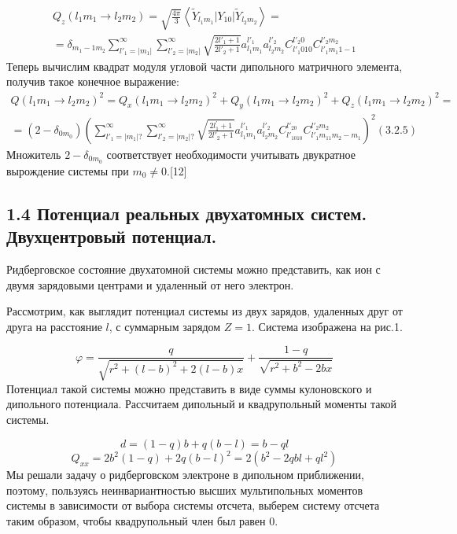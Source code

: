 \documentclass[a4paper]{article}
\begin{document}
\begin{multline*}
Q_z\left(l_1m_1\rightarrow l_2m_2\right)=\sqrt{\frac{4\pi } 3} \left< \widetilde Y_{l_1m_1}|Y_{10}|\widetilde Y_{l_2m_2} \right> =
\\
= \delta_{m_1-1 m_2}\sum_{l'_1=|m_1|}^{\infty} \sum_{l'_2=|m_2|}^{\infty}\sqrt{\frac{2l'_1+1}{2l'_2+1}}a_{l_1 m_1}^{l'_1 } a_{l_2 m_2}^{l'_2} C_{l'_1 010}^{l'_2 0} C_{l'_1 m_1 1-1}^{l'_2 m_2 }
\end{multline*}
Теперь вычислим квадрат модуля угловой части дипольного матричного элемента, получив такое конечное выражение:
\begin{multline*}
	Q\left(l_1m_1\rightarrow l_2m_2\right)^2=
Q_x\left(l_1m_1\rightarrow l_2m_2\right)^2+Q_y\left(l_1m_1\rightarrow l_2m_2\right)^2+Q_z\left(l_1m_1\rightarrow l_2m_2\right)^2 =
\\
= \left(2-\delta _{0m_0}\right)\left(\sum _{l'_1=| m_1|
	?}^{{\infty}}\sum _{l'_2=| m_2|
	?}^{\infty} \sqrt{\frac{2l^{'}_1+1}{2l{'}_2+1}}a_{l_1m_1}^{l{'}_1}a_{l_2m_2}^{l{'}_2}C_{l{'}_1010}^{l{'}_20}C_{l{'}_1 m_11 m_2-m_1}^{l{'}_2m_2}\right)^2(3.2.5)
\end{multline*}
Множитель  $2-\delta _{0m_0}$ соответствует необходимости учитывать двукратное вырождение системы при  $m_0{\neq}0$.{[12]}

\subsection{1.4 Потенциал
реальных двухатомных систем. Двухцентровый
потенциал.}
\hypertarget{RefHeading4693463868395}{}{\par}
Ридберговское состояние двухатомной системы можно представить, как ион с двумя зарядовыми центрами и удаленный от него электрон.

Рассмотрим, как выглядит потенциал системы из двух зарядов, удаленных друг от друга на
расстояние $l$, с суммарным зарядом $Z=1$. Система
изображена на рис.1.

\begin{equation*}
\varphi =\frac q{\sqrt{r^2+(l-b)^2+2(l-b)x}}+\frac{1-q}{\sqrt{r^2+b^2-2\mathit{bx}}}
\end{equation*}
Потенциал такой системы можно представить в виде суммы кулоновского и дипольного потенциала. Рассчитаем дипольный и квадрупольный моменты такой системы.

\begin{equation*}
d=\left(1-q\right)b+q\left(b-l\right)=b-\mathit{ql}
\end{equation*}
\begin{equation*}
Q_{\mathit{xx}}=2b^2\left(1-q\right)+2q\left(b-l\right)^2=2\left(b^2-2q\mathit{bl}+ql^2\right)
\end{equation*}
Мы решали задачу о ридберговском электроне в дипольном приближении, поэтому, пользуясь неинвариантностью высших мультипольных моментов системы в зависимости от выбора системы отсчета, выберем систему отсчета таким образом, чтобы квадрупольный член был равен 0.
\end{document}
